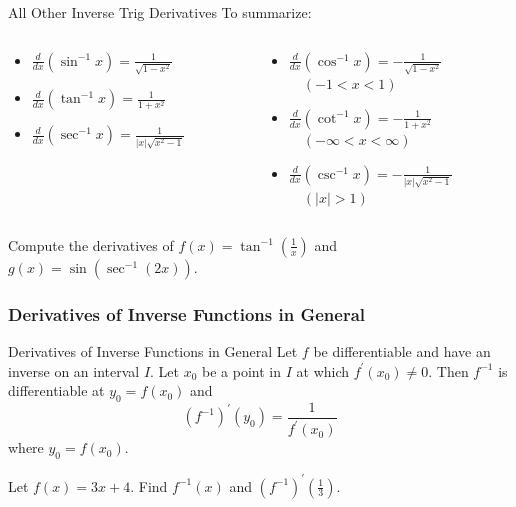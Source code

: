 \documentclass[cal1spr16Lectures.tex]{subfiles}
\begin{document}
\begin{frame}{\small All Other Inverse Trig Derivatives}
To summarize:
\begin{columns}
\begin{column}{0.45\textwidth}
	\begin{itemize}
	\item[]$\textstyle\frac{d}{dx}(\sin^{-1}x)=\frac{1}{\sqrt{1-x^2}}$
	\item[]$\textstyle\frac{d}{dx}(\tan^{-1}x)=\frac{1}{1+x^2}$ 
	\item[]$\textstyle\frac{d}{dx}(\sec^{-1}x)=\frac{1}{|x|\sqrt{x^2-1}}$ 
	\end{itemize}
\end{column}
\begin{column}{0.6\textwidth}
	\begin{itemize}
	\item[] \alert{$\textstyle\frac{d}{dx}(\cos^{-1}x)=-\frac{1}{\sqrt{1-x^2}}$} \\
	$\quad (-1<x<1)$ 
	\item[] \alert{$\textstyle\frac{d}{dx}(\cot^{-1}x)=-\frac{1}{1+x^2}$} \\
	$\quad (-\infty<x<\infty) $ 
	\item[] \alert{$\textstyle\frac{d}{dx}(\csc^{-1}x)=-\frac{1}{|x|\sqrt{x^2-1}}$} \\
	$\quad (|x|>1)$ 
	\end{itemize}
\end{column}
\end{columns}
\end{frame}

\begin{frame}
\begin{ex} Compute the derivatives of $f(x)=\tan^{-1}\left(\textstyle\frac{1}{x}\right)$ and $g(x)=\sin \left(\sec^{-1}(2x) \right)$. \end{ex}
\end{frame}

\subsubsection{Derivatives of Inverse Functions in General}

\begin{frame}{\small Derivatives of Inverse Functions in General}\footnotesize
Let $f$ be differentiable and have an inverse on an interval $I$.  Let $x_0$ be a point in $I$ at which $f^{\prime}(x_0)\ne0$.  Then $f^{-1}$ is differentiable at $y_0=f(x_0)$ and 
\[\left(f^{-1}\right)^{\prime}(y_0)=\frac{1}{f^{\prime}(x_0)}\]
where $y_0=f(x_0)$.
\begin{ex} Let $f(x)=3x+4$.  Find $f^{-1}(x)$ and $\left(f^{-1}\right)^{\prime}\left(\textstyle\frac{1}{3}\right)$. \end{ex}
\end{frame}
\end{document}
